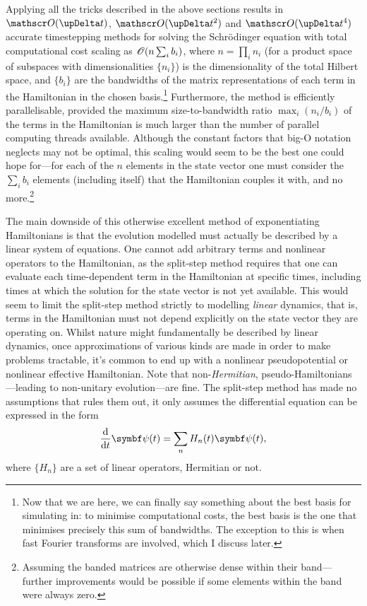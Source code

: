 Applying all the tricks described in the above sections results in $\Ord{\upDelta t}$, $\Ord{\upDelta t^2}$ and $\Ord{\upDelta t^4}$ accurate timestepping methods for solving the Schr\"odinger equation with total computational cost scaling as $\mathscr{O}(n \sum_i b_i)$, where $n=\prod_i n_i$ (for a product space of subspaces with dimensionalities $\{n_i\}$) is the dimensionality of the total Hilbert space, and $\{b_i\}$ are the bandwidths of the matrix representations of each term in the Hamiltonian in the chosen basis.\footnote{Now that we are here, we can finally say something about the best basis for simulating in: to minimise computational costs, the best basis is the one that minimises precisely this sum of bandwidths. The exception to this is when fast Fourier transforms are involved, which I discuss later.} Furthermore, the method is efficiently parallelisable, provided the maximum size-to-bandwidth ratio $\max_i(n_i/b_i)$ of the terms in the Hamiltonian is much larger than the number of parallel computing threads available. Although the constant factors that big-O notation neglects may not be optimal, this scaling would seem to be the best one could hope for---for each of the $n$ elements in the state vector one must consider the $\sum_i b_i$ elements (including itself) that the Hamiltonian couples it with, and no more.\footnote{Assuming the banded matrices are otherwise dense within their band---further improvements would be possible if some elements within the band were always zero.}

The main downside of this otherwise excellent method of exponentiating Hamiltonians is that the evolution modelled must actually be described by a linear system of equations. One cannot add arbitrary terms and nonlinear operators to the Hamiltonian, as the split-step method requires that one can evaluate each time-dependent term in the Hamiltonian at specific times, including times at which the solution for the state vector is not yet available. This would seem to limit the split-step method strictly to modelling \emph{linear} dynamics, that is, terms in the Hamiltonian must not depend explicitly on the state vector they are operating on. Whilst nature might fundamentally be described by linear dynamics, once approximations of various kinds are made in order to make problems tractable, it's common to end up with a nonlinear pseudopotential or nonlinear effective Hamiltonian. Note that non-\emph{Hermitian}, pseudo-Hamiltonians---leading to non-unitary evolution---are fine. The split-step method has made no assumptions that rules them out, it only assumes the differential equation can be expressed in the form
\begin{align}
\dv t \vec\psi(t) = \sum_n H_n(t)\vec\psi(t),
\end{align}
where $\{H_n\}$ are a set of linear operators, Hermitian or not.

